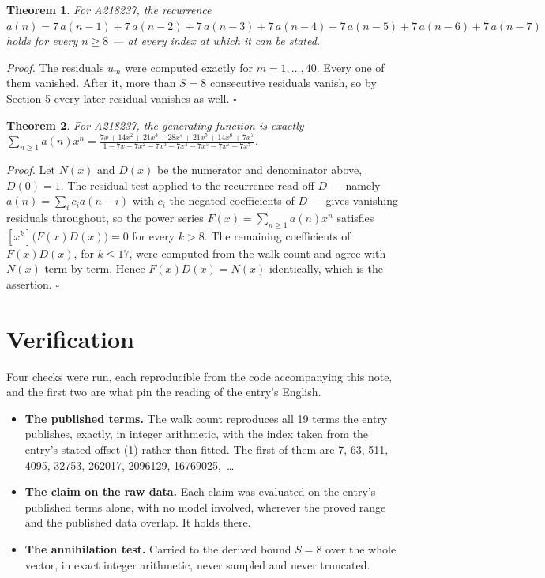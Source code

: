 \documentclass[11pt]{article}
\newtheorem{theorem}{Theorem}
\theoremstyle{definition}
\begin{document}
\begin{theorem} For A218237, the recurrence $a(n) = 7\,a(n-1) + 7\,a(n-2) + 7\,a(n-3) + 7\,a(n-4) + 7\,a(n-5) + 7\,a(n-6) + 7\,a(n-7)$ holds for every $n \ge 8$ --- at every index at which it can be stated.\end{theorem}

{\itshape Proof.} The residuals $u_m$ were computed exactly for $m = 1,\dots,40$. Every one of them vanished. After it, more than $S = 8$ consecutive residuals vanish, so by Section 5 every later residual vanishes as well. $\square$

\begin{theorem} For A218237, the generating function is exactly $\sum_{n\ge 1} a(n)x^n = \frac{7x + 14x^{2} + 21x^{3} + 28x^{4} + 21x^{5} + 14x^{6} + 7x^{7}}{1 - 7x - 7x^{2} - 7x^{3} - 7x^{4} - 7x^{5} - 7x^{6} - 7x^{7}}$.\end{theorem}

{\itshape Proof.} Let $N(x)$ and $D(x)$ be the numerator and denominator above, $D(0)=1$. The residual test applied to the recurrence read off $D$ --- namely $a(n) = \sum_i c_i a(n-i)$ with $c_i$ the negated coefficients of $D$ --- gives vanishing residuals throughout, so the power series $F(x)=\sum_{n\ge 1}a(n)x^n$ satisfies $[x^k]\bigl(F(x)D(x)\bigr) = 0$ for every $k > 8$. The remaining coefficients of $F(x)D(x)$, for $k \le 17$, were computed from the walk count and agree with $N(x)$ term by term. Hence $F(x)D(x) = N(x)$ identically, which is the assertion. $\square$

\section{Verification}

Four checks were run, each reproducible from the code accompanying this note, and the first two are what pin the reading of the entry's English.

\begin{itemize}

\item {\bfseries The published terms.} The walk count reproduces all 19 terms the entry publishes, exactly, in integer arithmetic, with the index taken from the entry's stated offset (1) rather than fitted. The first of them are 7, 63, 511, 4095, 32753, 262017, 2096129, 16769025,~\dots

\item {\bfseries The claim on the raw data.} Each claim was evaluated on the entry's published terms alone, with no model involved, wherever the proved range and the published data overlap. It holds there.

\item {\bfseries The annihilation test.} Carried to the derived bound $S = 8$ over the whole vector, in exact integer arithmetic, never sampled and never truncated.

\end{itemize}
\end{document}
